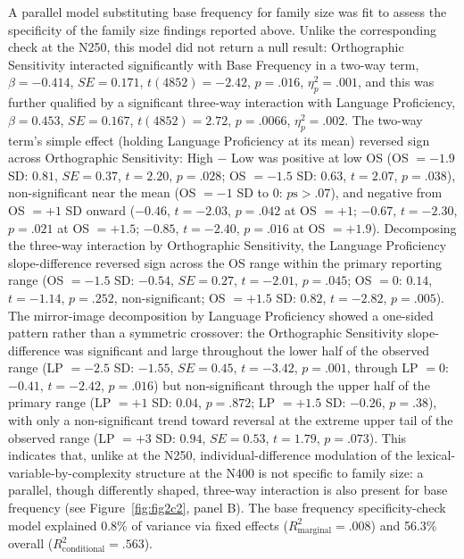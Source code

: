 \documentclass[utf8]{FrontiersinHarvard} %
\begin{document}
	A parallel model substituting base frequency for family size was fit to assess the specificity of the family size findings reported above. Unlike the corresponding check at the N250, this model did not return a null result: Orthographic Sensitivity interacted significantly with Base Frequency in a two-way term, $\beta = -0.414$, $SE = 0.171$, $t(4852) = -2.42$, $p = .016$, $\eta^2_p = .001$, and this was further qualified by a significant three-way interaction with Language Proficiency, $\beta = 0.453$, $SE = 0.167$, $t(4852) = 2.72$, $p = .0066$, $\eta^2_p = .002$. The two-way term's simple effect (holding Language Proficiency at its mean) reversed sign across Orthographic Sensitivity: High $-$ Low was positive at low OS (OS $= -1.9$ SD: $0.81$, $SE = 0.37$, $t = 2.20$, $p = .028$; OS $= -1.5$ SD: $0.63$, $t = 2.07$, $p = .038$), non-significant near the mean (OS $= -1$ SD to $0$: $p\text{s} > .07$), and negative from OS $= +1$ SD onward ($-0.46$, $t = -2.03$, $p = .042$ at OS $= +1$; $-0.67$, $t = -2.30$, $p = .021$ at OS $= +1.5$; $-0.85$, $t = -2.40$, $p = .016$ at OS $= +1.9$). Decomposing the three-way interaction by Orthographic Sensitivity, the Language Proficiency slope-difference reversed sign across the OS range within the primary reporting range (OS $= -1.5$ SD: $-0.54$, $SE = 0.27$, $t = -2.01$, $p = .045$; OS $= 0$: $0.14$, $t = -1.14$, $p = .252$, non-significant; OS $= +1.5$ SD: $0.82$, $t = -2.82$, $p = .005$). The mirror-image decomposition by Language Proficiency showed a one-sided pattern rather than a symmetric crossover: the Orthographic Sensitivity slope-difference was significant and large throughout the lower half of the observed range (LP $= -2.5$ SD: $-1.55$, $SE = 0.45$, $t = -3.42$, $p = .001$, through LP $= 0$: $-0.41$, $t = -2.42$, $p = .016$) but non-significant through the upper half of the primary range (LP $= +1$ SD: $0.04$, $p = .872$; LP $= +1.5$ SD: $-0.26$, $p = .38$), with only a non-significant trend toward reversal at the extreme upper tail of the observed range (LP $= +3$ SD: $0.94$, $SE = 0.53$, $t = 1.79$, $p = .073$). This indicates that, unlike at the N250, individual-difference modulation of the lexical-variable-by-complexity structure at the N400 is not specific to family size: a parallel, though differently shaped, three-way interaction is also present for base frequency (see Figure~\ref{fig:fig2c2}, panel B). The base frequency specificity-check model explained 0.8\% of variance via fixed effects ($R^2_{\mathrm{marginal}} = .008$) and 56.3\% overall ($R^2_{\mathrm{conditional}} = .563$).
\end{document}
